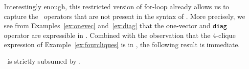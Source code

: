 Interestingly enough, this restricted version of for-loop already allows us to capture the \lang\ operators that are not present in the syntax of \langsum. More precisely, we see from Examples~\ref{ex:onevec} and~\ref{ex:diag} that the one-vector and $\texttt{diag}$ operator are expressible in \langsum. Combined with the observation that the $4$-clique
expression of Example~\ref{ex:fourcliques} is in \langsum, the following result is immediate.
%
%
%
%
%

\begin{corollary}
\lang\ is strictly subsumed by \langsum.
\end{corollary}


